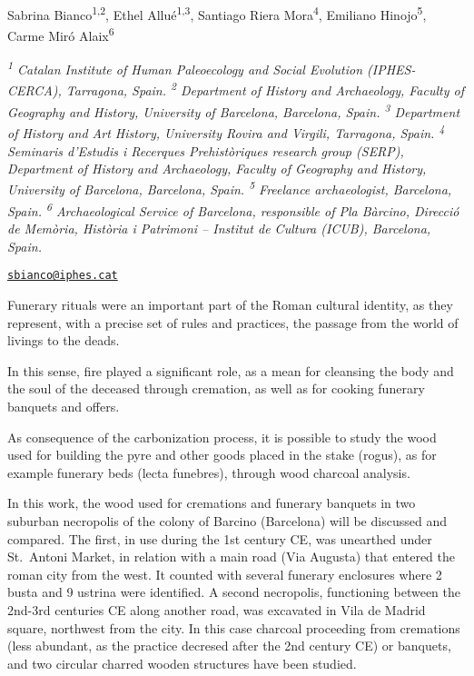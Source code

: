 \documentclass[
]{book}
\begin{document}
Sabrina Bianco\textsuperscript{1,2}, Ethel Allué\textsuperscript{1,3}, Santiago Riera Mora\textsuperscript{4}, Emiliano Hinojo\textsuperscript{5}, Carme Miró Alaix\textsuperscript{6}

\emph{\textsuperscript{1} Catalan Institute of Human Paleoecology and Social Evolution (IPHES-CERCA), Tarragona, Spain. \textsuperscript{2} Department of History and Archaeology, Faculty of Geography and History, University of Barcelona, Barcelona, Spain. \textsuperscript{3} Department of History and Art History, University Rovira and Virgili, Tarragona, Spain. \textsuperscript{4} Seminaris d'Estudis i Recerques Prehistòriques research group (SERP), Department of History and Archaeology, Faculty of Geography and History, University of Barcelona, Barcelona, Spain. \textsuperscript{5} Freelance archaeologist, Barcelona, Spain. \textsuperscript{6} Archaeological Service of Barcelona, responsible of Pla Bàrcino, Direcció de Memòria, Història i Patrimoni -- Institut de Cultura (ICUB), Barcelona, Spain.}

\href{mailto:sbianco@iphes.cat}{\nolinkurl{sbianco@iphes.cat}}

Funerary rituals were an important part of the Roman cultural identity, as they represent, with a precise set of rules and practices, the passage from the world of livings to the deads.

In this sense, fire played a significant role, as a mean for cleansing the body and the soul of the deceased through cremation, as well as for cooking funerary banquets and offers.

As consequence of the carbonization process, it is possible to study the wood used for building the pyre and other goods placed in the stake (rogus), as for example funerary beds (lecta funebres), through wood charcoal analysis.

In this work, the wood used for cremations and funerary banquets in two suburban necropolis of the colony of Barcino (Barcelona) will be discussed and compared. The first, in use during the 1st century CE, was unearthed under St.~Antoni Market, in relation with a main road (Via Augusta) that entered the roman city from the west. It counted with several funerary enclosures where 2 busta and 9 ustrina were identified. A second necropolis, functioning between the 2nd-3rd centuries CE along another road, was excavated in Vila de Madrid square, northwest from the city. In this case charcoal proceeding from cremations (less abundant, as the practice decresed after the 2nd century CE) or banquets, and two circular charred wooden structures have been studied.
\end{document}
